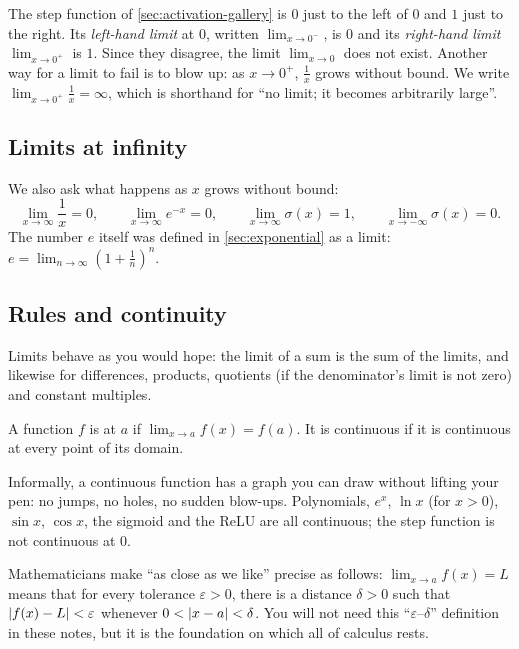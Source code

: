 The step function of \cref{sec:activation-gallery} is $0$ just to the left of
$0$ and $1$ just to the right. Its \emph{left-hand limit} at $0$, written
$\lim_{x\to0^-}$, is $0$ and its \emph{right-hand limit} $\lim_{x\to0^+}$ is
$1$. Since they disagree, the limit $\lim_{x\to0}$ does not exist. Another way
for a limit to fail is to blow up: as $x \to 0^+$, $\frac1x$ grows without
bound. We write $\lim_{x\to0^+}\frac1x = \infty$, which is shorthand for ``no
limit; it becomes arbitrarily large''.

\subsection{Limits at infinity}

We also ask what happens as $x$ grows without bound:
\[
  \lim_{x\to\infty}\frac1x = 0, \qquad
  \lim_{x\to\infty}e^{-x} = 0, \qquad
  \lim_{x\to\infty}\sigma(x) = 1, \qquad
  \lim_{x\to-\infty}\sigma(x) = 0 .
\]
The number $e$ itself was defined in \cref{sec:exponential} as a limit:
$e = \lim_{n\to\infty}\left(1 + \frac1n\right)^n$.

\subsection{Rules and continuity}

Limits behave as you would hope: the limit of a sum is the sum of the limits,
and likewise for differences, products, quotients (if the denominator's limit
is not zero) and constant multiples.

\begin{definition}[Continuity]\label{def:continuity}
A function $f$ is  at $a$ if
$\lim_{x\to a}f(x) = f(a)$. It is continuous if it is continuous at every point
of its domain.
\end{definition}

Informally, a continuous function has a graph you can draw without lifting your
pen: no jumps, no holes, no sudden blow-ups. Polynomials, $e^x$, $\ln x$ (for
$x > 0$), $\sin x$, $\cos x$, the sigmoid and the ReLU are all continuous; the
step function is not continuous at $0$.

\begin{remark}
Mathematicians make ``as close as we like'' precise as follows:
$\lim_{x\to a}f(x) = L$ means that for every tolerance $\varepsilon > 0$, there
is a distance $\delta > 0$ such that $\lvert f(x) - L\rvert < \varepsilon$ whenever
$0 < \lvert x - a\rvert < \delta$. You will not need this ``$\varepsilon$--$\delta$''
definition in these notes, but it is the foundation on which all of calculus
rests.
\end{remark}

